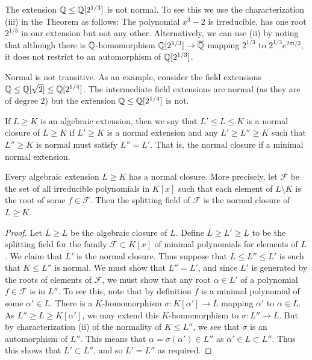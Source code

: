 \documentclass[twoside, a4paper, 10pt]{amsart}
\begin{document}
\begin{eg} The extension $\mathbb{Q} \leq \mathbb{Q}[2^{1/3}]$ is not normal. To see this we use the characterization (iii) in the Theorem as follows: The polynomial $x^3 - 2$ is irreducible, has one root $2^{1/3}$ in our extension but not any other. Alternatively, we can use (ii) by noting that although there is $\mathbb{Q}$-homomorphism $\mathbb{Q}[2^{1/3}] \to \overline{\mathbb{Q}}$ mapping $2^{1/3}$ to $2^{1/3} e^{2\pi i /3}$, it does not restrict to an automorphism of $\mathbb{Q}[2^{1/3}]$.

\end{eg}

\begin{eg} Normal is not transitive. As an example, consider the field extensions $\mathbb{Q} \leq \mathbb{Q}[\sqrt{2}] \leq \mathbb{Q}[2^{1/4}]$. The intermediate field extensions are normal (as they are of degree $2$) but the extension $\mathbb{Q} \leq \mathbb{Q}[2^{1/4}]$ is not.

\end{eg}

\begin{mydef} If $L \geq K$ is an algebraic extension, then we say that $L' \leq L \leq K$ is a normal closure of $L \geq K$ if $L' \geq K$ is a normal extension and any $L' \geq L'' \geq K$ such that $L'' \geq K$ is normal must satisfy $L'' = L'$. That is, the normal closure if a minimal normal extension.

\end{mydef}

\begin{prop} \label{prop: normal closure existence} Every algebraic extension $L \geq K$ has a normal closure. More precisely, let $\mathcal{F}$ be the set of all irreducible polynomials in $K[x]$ such that each element of $L \setminus K$ is the root of some $f \in \mathcal{F}$. Then the splitting field of $\mathcal{F}$ is the normal closure of $L \geq K$.

\end{prop}

\begin{proof} Let $\overline{L} \geq L$ be the algebraic closure of $L$. Define $\overline{L} \geq L' \geq L$ to be the splitting field for the family $\mathcal{F} \subset K[x]$ of minimal polynomials for elements of $L$. We claim that $L'$ is the normal closure. Thus suppose that $L \leq L'' \leq L'$ is such that $K \leq L''$ is normal. We must show that $L'' = L'$, and since $L'$ is generated by the roots of elements of $\mathcal{F}$, we must show that any root $\alpha \in L'$ of a polynomial $f \in \mathcal{F}$ is in $L''$. To see this, note that by definition $f$ is a minimal polynomial of some $\alpha' \in L$. There is a $K$-homomorphism $\sigma:K[\alpha'] \to \overline{L}$ mapping $\alpha'$ to $\alpha \in L$. As $L'' \geq L \geq K[\alpha']$, we may extend this $K$-homomorphism to $\sigma:L'' \to \overline{L}$. But by characterization (ii) of the normality of $K \leq L''$, we see that $\sigma$ is an automorphism of $L''$. This means that $\alpha = \sigma(\alpha') \in L''$ as $\alpha' \in L \subset L''$. Thus this shows that $L' \subset L''$, and so $L' = L''$ as required. \end{proof}
\end{document}
